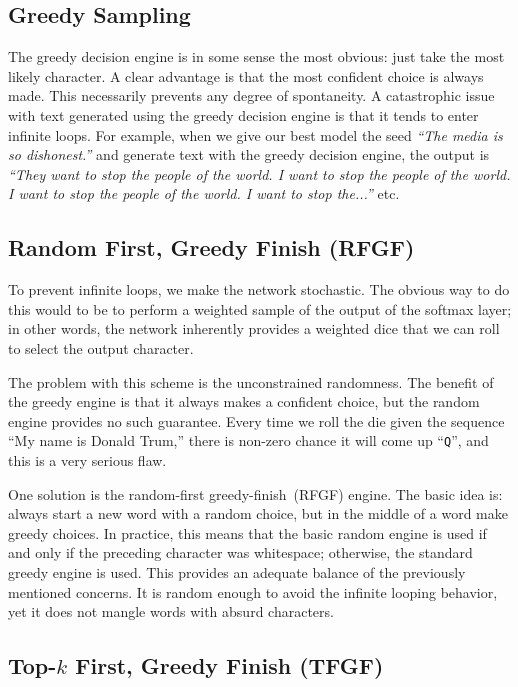 \documentclass{article}
\begin{document}
\subsection{Greedy Sampling}\label{sec:greedySampling}

The greedy decision engine is in some sense the most obvious: just take the most likely character. A clear advantage is that the most confident choice is always made. This necessarily prevents any degree of spontaneity. A catastrophic issue with text generated using the greedy decision engine is that it tends to enter infinite loops. For example, when we give our best model the seed \textit{``The media is so dishonest.''} and generate text with the greedy decision engine, the output is \textit{``They want to stop the people of the world. I want to stop the people of the world. I want to stop the people of the world. I want to stop the...''} etc.

\subsection{Random First, Greedy Finish (RFGF)}

To prevent infinite loops, we make the network stochastic. The obvious way to do this would to be to perform a weighted sample of the output of the softmax layer; in other words, the network inherently provides a weighted dice that we can roll to select the output character.

The problem with this scheme is the unconstrained randomness. The benefit of the greedy engine is that it always makes a confident choice, but the random engine provides no such guarantee. Every time we roll the die given the sequence ``My name is Donald Trum,'' there is non-zero chance it will come up ``\texttt{Q}'', and this is a very serious flaw.

One solution is the random-first greedy-finish~(RFGF) engine. The basic idea is: always start a new word with a random choice, but in the middle of a word make greedy choices. In practice, this means that the basic random engine is used if and only if the preceding character was whitespace; otherwise, the standard greedy engine is used. This provides an adequate balance of the previously mentioned concerns. It is random enough to avoid the infinite looping behavior, yet it does not mangle words with absurd characters.

\subsection{Top-$\mathbf{\textit{k}}$ First, Greedy Finish (TFGF)}
\end{document}
